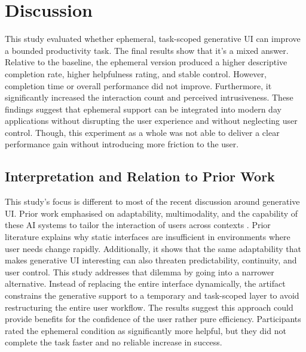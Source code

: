 \pagestyle{fancy} 
\section{Discussion}

This study evaluated whether ephemeral, task-scoped generative UI can improve a bounded productivity task. The final results show that it's a mixed answer. Relative to the baseline, the ephemeral version produced a higher descriptive completion rate, higher helpfulness rating, and stable control. However, completion time or overall performance did not improve. Furthermore, it significantly increased the interaction count and perceived intrusiveness. These findings suggest that ephemeral support can be integrated into modern day applications without disrupting the user experience and without neglecting user control. Though, this experiment as a whole was not able to deliver a clear performance gain without introducing more friction to the user.

\subsection{Interpretation and Relation to Prior Work}

This study's focus is different to most of the recent discussion around generative UI. Prior work emphasised on adaptability, multimodality, and the capability of these AI systems to tailor the interaction of users across contexts \parencite{Bieniek2024GenerativeAI}. Prior literature explains why static interfaces are insufficient in environments where user needs change rapidly. Additionally, it shows that the same adaptability that makes generative UI interesting can also threaten predictability, continuity, and user control. This study addresses that dilemma by going into a narrower alternative. Instead of replacing the entire interface dynamically, the artifact constrains the generative support to a temporary and task-scoped layer to avoid restructuring the entire user workflow. The results suggest this approach could provide benefits for the confidence of the user rather pure efficiency. Participants rated the ephemeral condition as significantly more helpful, but they did not complete the task faster and no reliable increase in success.

